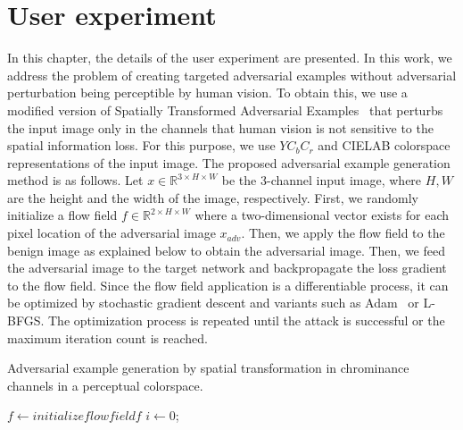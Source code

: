 \chapter{User experiment}
\label{chp:3_methodology}
In this chapter, the details of the user experiment are presented.
In this work, we address the problem of creating targeted adversarial examples without adversarial perturbation being perceptible by human vision. To obtain this, we use a modified version of Spatially Transformed Adversarial Examples~\cite{xiao2018spatially} that perturbs the input image only in the channels that human vision is not sensitive to the spatial information loss. For this purpose, we use \(YC_{b}C_{r}\) and CIELAB colorspace representations of the input image. The proposed adversarial example generation method is as follows. Let \(x \in \mathbb{R}^{3\times H \times W}\) be the 3-channel input image, where \(H, W\) are the height and the width of the image, respectively. First, we randomly initialize a flow field \(f \in \mathbb{R}^{2\times H \times W}\) where a two-dimensional vector exists for each pixel location of the adversarial image \(x_{adv}\). Then, we apply the flow field to the benign image as explained below to obtain the adversarial image. Then, we feed the adversarial image to the target network and backpropagate the loss gradient to the flow field. Since the flow field application is a differentiable process, it can be optimized by stochastic gradient descent and variants such as Adam~\cite{kingma2015adam} or L-BFGS\cite{liu1989limited}. The optimization process is repeated until the attack is successful or the maximum iteration count is reached.
\begin{algorithm}[t]
    \caption{Adversarial example generation by spatial transformation in chrominance channels in a perceptual colorspace. }\label{alg1}
    \(f \gets initialize flow field f\)\;
    \(i \gets 0\);

\end{algorithm}


